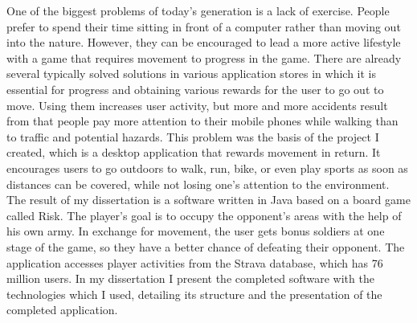 One of the biggest problems of today’s generation is a lack of exercise.
People prefer to spend their time sitting in front of a computer rather than moving out into the nature.
However, they can be encouraged to lead a more active lifestyle with a game that requires movement to progress in the game.
There are already several typically solved solutions in various application stores in which it is essential for progress and obtaining various rewards for the user to go out to move.
Using them increases user activity, but more and more accidents result from that people pay more attention to their mobile phones while walking than to traffic and potential hazards.
This problem was the basis of the project I created, which is a desktop application that rewards movement in return.
It encourages users to go outdoors to walk, run, bike, or even play sports as soon as distances can be covered, while not losing one’s attention to the environment.
The result of my dissertation is a software written in Java based on a board game called Risk.
The player's goal is to occupy the opponent's areas with the help of his own army.
In exchange for movement, the user gets bonus soldiers at one stage of the game, so they have a better chance of defeating their opponent.
The application accesses player activities from the Strava database, which has 76 million users.
In my dissertation I present the completed software with the technologies which I used, detailing its structure and the presentation of the completed application.